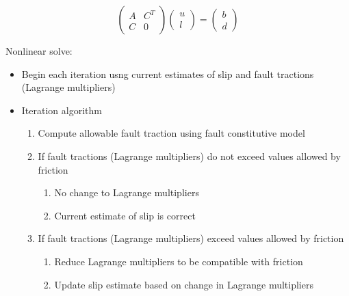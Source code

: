 \documentclass[pdftex,cig,slideColor]{pp4slides}
\begin{document}

  \vfill
  \vspace*{-14pt}
  \begin{equation}
    \left( \begin{array}{cc}
        A & C^T \\ C & 0
      \end{array} \right)
    \left( \begin{array}{c}
        u \\ l
      \end{array} \right)
    =
    \left( \begin{array}{c}
        b \\ d
      \end{array} \right)
  \end{equation}
  \vfill

  Nonlinear solve:
  \begin{itemize}
  \item Begin each iteration usng current estimates of slip and fault
    tractions (Lagrange multipliers)
  \item Iteration algorithm
    \begin{enumerate}
    \item Compute allowable fault traction using fault constitutive
      model
    \item If fault tractions (Lagrange multipliers) do not exceed values
      allowed by friction
     \begin{enumerate}
      \item No change to Lagrange multipliers
      \item Current estimate of slip is correct
      \end{enumerate}
    \item If fault tractions (Lagrange multipliers) exceed  values
      allowed by friction
     \begin{enumerate}
      \item Reduce Lagrange multipliers to be compatible with friction
      \item Update slip estimate based on change in Lagrange multipliers
      \end{enumerate}
    \end{enumerate}
  \end{itemize}
  
\end{document}
